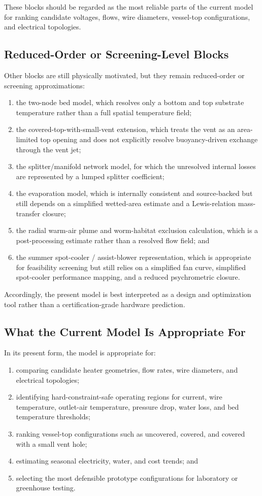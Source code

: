 \documentclass{article}
\begin{document}
These blocks should be regarded as the most reliable parts of the current
model for ranking candidate voltages, flows, wire diameters, vessel-top
configurations, and electrical topologies.

\subsection{Reduced-Order or Screening-Level Blocks}

Other blocks are still physically motivated, but they remain reduced-order or
screening approximations:
\begin{enumerate}
\item the two-node bed model, which resolves only a bottom and top substrate
temperature rather than a full spatial temperature field;
\item the covered-top-with-small-vent extension, which treats the vent as an
area-limited top opening and does not explicitly resolve buoyancy-driven
exchange through the vent jet;
\item the splitter/manifold network model, for which the unresolved internal
losses are represented by a lumped splitter coefficient;
\item the evaporation model, which is internally consistent and source-backed
but still depends on a simplified wetted-area estimate and a Lewis-relation
mass-transfer closure;
\item the radial warm-air plume and worm-habitat exclusion calculation, which
is a post-processing estimate rather than a resolved flow field; and
\item the summer spot-cooler / assist-blower representation, which is
appropriate for feasibility screening but still relies on a simplified fan
curve, simplified spot-cooler performance mapping, and a reduced psychrometric
closure.
\end{enumerate}

Accordingly, the present model is best interpreted as a design and
optimization tool rather than a certification-grade hardware prediction.

\subsection{What the Current Model Is Appropriate For}

In its present form, the model is appropriate for:
\begin{enumerate}
\item comparing candidate heater geometries, flow rates, wire diameters, and
electrical topologies;
\item identifying hard-constraint-safe operating regions for current, wire
temperature, outlet-air temperature, pressure drop, water loss, and bed
temperature thresholds;
\item ranking vessel-top configurations such as uncovered, covered, and
covered with a small vent hole;
\item estimating seasonal electricity, water, and cost trends; and
\item selecting the most defensible prototype configurations for laboratory or
greenhouse testing.
\end{enumerate}
\end{document}
